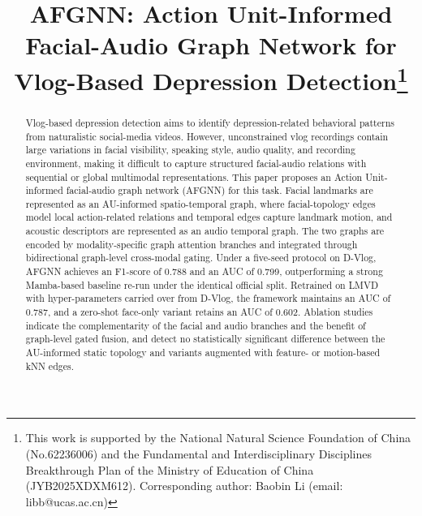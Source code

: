 \documentclass[conference]{IEEEtran}
\begin{document}
\title{AFGNN: Action Unit-Informed Facial-Audio Graph Network for Vlog-Based Depression Detection\thanks{This work is supported by the National Natural Science Foundation of China (No.62236006) and the Fundamental and Interdisciplinary Disciplines Breakthrough Plan of the Ministry of Education of China (JYB2025XDXM612). Corresponding author: Baobin Li (email: libb@ucas.ac.cn)}}

\author{
}

\maketitle
\begin{abstract}
Vlog-based depression detection aims to identify depression-related behavioral patterns from naturalistic social-media videos. However, unconstrained vlog recordings contain large variations in facial visibility, speaking style, audio quality, and recording environment, making it difficult to capture structured facial-audio relations with sequential or global multimodal representations. This paper proposes an Action Unit-informed facial-audio graph network (AFGNN) for this task. Facial landmarks are represented as an AU-informed spatio-temporal graph, where facial-topology edges model local action-related relations and temporal edges capture landmark motion, and acoustic descriptors are represented as an audio temporal graph. The two graphs are encoded by modality-specific graph attention branches and integrated through bidirectional graph-level cross-modal gating. Under a five-seed protocol on D-Vlog, AFGNN achieves an F1-score of 0.788 and an AUC of 0.799, outperforming a strong Mamba-based baseline re-run under the identical official split. Retrained on LMVD with hyper-parameters carried over from D-Vlog, the framework maintains an AUC of 0.787, and a zero-shot face-only variant retains an AUC of 0.602. Ablation studies indicate the complementarity of the facial and audio branches and the benefit of graph-level gated fusion, and detect no statistically significant difference between the AU-informed static topology and variants augmented with feature- or motion-based kNN edges.
\end{abstract}
\end{document}
